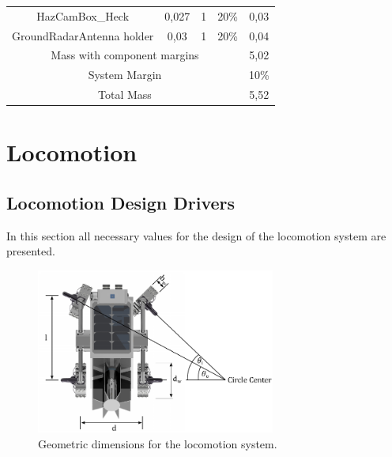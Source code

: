 \begin{table}[hbt]
{\begin{tabular}{@{}llllll@{}}
\multicolumn{2}{c}{HazCamBox\_Heck}                  & \multicolumn{1}{c}{0,027}                        & \multicolumn{1}{c}{1}        & \multicolumn{1}{c}{20\%}             & \multicolumn{1}{c}{0,03}           \\
\multicolumn{2}{c}{GroundRadarAntenna  holder}       & \multicolumn{1}{c}{0,03}                         & \multicolumn{1}{c}{1}        & \multicolumn{1}{c}{20\%}             & \multicolumn{1}{c}{0,04}           \\ \midrule
\multicolumn{5}{c}{Mass with component margins}                                                                                                                               & \multicolumn{1}{c}{5,02}           \\
\multicolumn{5}{c}{System Margin}                                                                                                                                             & \multicolumn{1}{c}{10\%}           \\
\multicolumn{5}{c}{Total Mass}                                                                                                                                                & \multicolumn{1}{c}{5,52}           \\\bottomrule
\end{tabular}%
}
\label{tab:ChassiBudget}
\end{table}




\clearpage

\setcounter{figure}{0}
\setcounter{table}{0}

\section{Locomotion} 
\label{app:Loco}

\subsection{Locomotion Design Drivers}
\label{app:DesignDrivers}

In this section all necessary values for the design of the locomotion system are presented.   


\begin{figure}[htb]
{\centering
\includegraphics[width=0.7\textwidth]{Media/Geometries}
\caption{Geometric dimensions for the locomotion system.}
\label{fig:Ackerman}
}
\end{figure}


